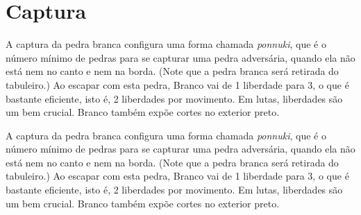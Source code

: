\chapter{Captura}

\problemDiagrams
\answerDiagrams%
  {A captura da pedra branca configura uma forma chamada \emph{ponnuki}, que é o número mínimo de pedras para se capturar uma pedra adversária, quando ela não está nem no canto e nem na borda. (Note que a pedra branca será retirada do tabuleiro.)}%
  {Ao escapar com esta pedra, Branco vai de 1 liberdade para 3, o que é bastante eficiente, isto é, 2 liberdades por movimento. Em lutas, liberdades são um bem crucial. Branco também expõe cortes no exterior preto.}%


\problemDiagrams
\answerDiagrams%
  {A captura da pedra branca configura uma forma chamada \emph{ponnuki}, que é o número mínimo de pedras para se capturar uma pedra adversária, quando ela não está nem no canto e nem na borda. (Note que a pedra branca será retirada do tabuleiro.)}%
  {Ao escapar com esta pedra, Branco vai de 1 liberdade para 3, o que é bastante eficiente, isto é, 2 liberdades por movimento. Em lutas, liberdades são um bem crucial. Branco também expõe cortes no exterior preto.}%